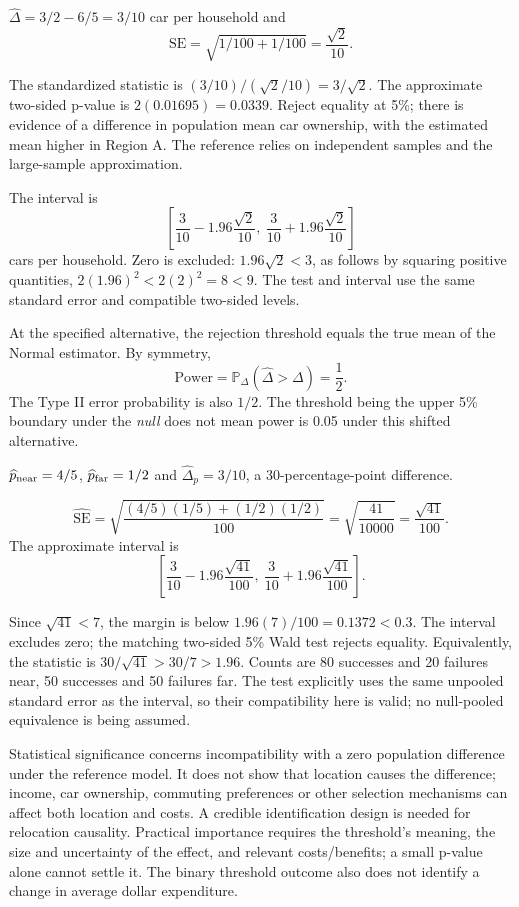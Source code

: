 \documentclass[11pt]{article}
\begin{document}
\begin{parts}
\item $\widehat\Delta=3/2-6/5=3/10$ car per household and
\[
\mathrm{SE}=\sqrt{1/100+1/100}=\frac{\sqrt2}{10}.
\]
\item The standardized statistic is $(3/10)/(\sqrt2/10)=3/\sqrt2$. The approximate two-sided p-value is $2(0.01695)=0.0339$. Reject equality at 5\%; there is evidence of a difference in population mean car ownership, with the estimated mean higher in Region A. The reference relies on independent samples and the large-sample approximation.
\item The interval is
\[
\left[\frac3{10}-1.96\frac{\sqrt2}{10},\ \frac3{10}+1.96\frac{\sqrt2}{10}\right]
\]
cars per household. Zero is excluded: $1.96\sqrt2<3$, as follows by squaring positive quantities, $2(1.96)^2<2(2)^2=8<9$. The test and interval use the same standard error and compatible two-sided levels.
\item At the specified alternative, the rejection threshold equals the true mean of the Normal estimator. By symmetry,
\[
\mathrm{Power}=\mathbb P_{\Delta}(\widehat\Delta>\Delta)=\frac12.
\]
The Type II error probability is also $1/2$. The threshold being the upper 5\% boundary under the \emph{null} does not mean power is 0.05 under this shifted alternative.
\end{parts}

\begin{parts}
\item $\widehat p_{\rm near}=4/5$, $\widehat p_{\rm far}=1/2$ and $\widehat\Delta_p=3/10$, a 30-percentage-point difference.
\item
\[
\widehat{\mathrm{SE}}=\sqrt{\frac{(4/5)(1/5)+(1/2)(1/2)}{100}}
=\sqrt{\frac{41}{10000}}=\frac{\sqrt{41}}{100}.
\]
The approximate interval is
\[
\left[\frac3{10}-1.96\frac{\sqrt{41}}{100},\ \frac3{10}+1.96\frac{\sqrt{41}}{100}\right].
\]
\item Since $\sqrt{41}<7$, the margin is below $1.96(7)/100=0.1372<0.3$. The interval excludes zero; the matching two-sided 5\% Wald test rejects equality. Equivalently, the statistic is $30/\sqrt{41}>30/7>1.96$. Counts are 80 successes and 20 failures near, 50 successes and 50 failures far. The test explicitly uses the same unpooled standard error as the interval, so their compatibility here is valid; no null-pooled equivalence is being assumed.
\item Statistical significance concerns incompatibility with a zero population difference under the reference model. It does not show that location causes the difference; income, car ownership, commuting preferences or other selection mechanisms can affect both location and costs. A credible identification design is needed for relocation causality. Practical importance requires the threshold's meaning, the size and uncertainty of the effect, and relevant costs/benefits; a small p-value alone cannot settle it. The binary threshold outcome also does not identify a change in average dollar expenditure.
\end{parts}
\end{document}
